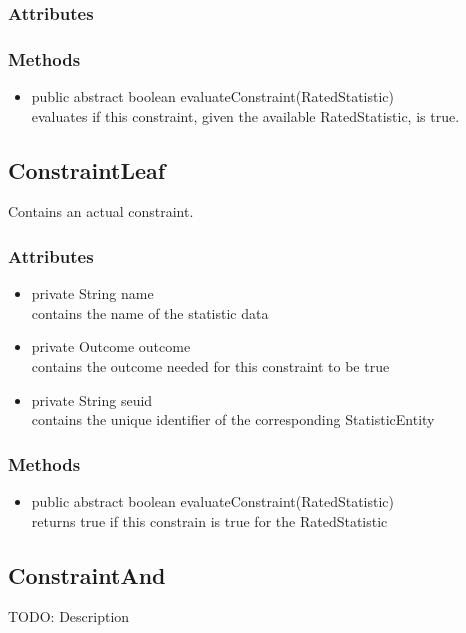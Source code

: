 \subsubsection{Attributes}
\subsubsection{Methods}
\begin{itemize}
	\item public abstract boolean evaluateConstraint(RatedStatistic)\\
	evaluates if this constraint, given the available RatedStatistic, is true. 
\end{itemize}		


\subsection{ConstraintLeaf }
Contains an actual constraint.

\subsubsection{Attributes}
\begin{itemize}
	\item private  String name\\
	contains the name of the statistic data
	\item private  Outcome outcome\\
	contains the outcome needed for this constraint to be true
	\item private  String seuid\\
	contains the unique identifier of the corresponding StatisticEntity
\end{itemize}
\subsubsection{Methods}
\begin{itemize}
	\item public abstract boolean evaluateConstraint(RatedStatistic)\\
	returns true if this constrain is true for the RatedStatistic
\end{itemize}


\subsection{ConstraintAnd }
TODO: Description

